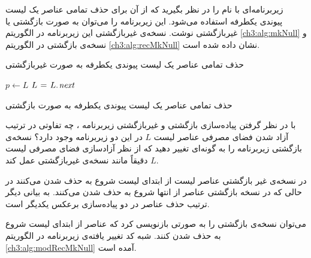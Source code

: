 

 زیربرنامه‌ای با نام {} را در نظر بگیرید که از آن برای حذف تمامی عناصر یک لیست پیوندی یکطرفه استفاده می‌شود. این زیربرنامه را می‌توان به صورت بازگشتی یا غیربازگشتی نوشت. نسخه‌ی غیربازگشتی این زیربرنامه در الگوریتم {\ref{ch3:alg:mkNull}} و نسخه‌ی بازگشتی در الگوریتم {\ref{ch3:alg:recMkNull}} نشان داده شده است.

\begin{algorithm}
\caption{حذف تمامی عناصر یک لیست پیوندی یکطرفه به صورت غیربازگشتی}\label{ch3:alg:mkNull}
\begin{latin}
\begin{algorithmic}[1]
				\State	$p \gets L$
				\State	$L \mathrel{\hspace{1pt}=\hspace{1pt}} L.\hspace*{1pt}\mathit{next}$
				\State	{}
		\EndWhile
\EndProcedure
\end{algorithmic}
\end{latin}
\end{algorithm}

\begin{algorithm}
\caption{حذف تمامی عناصر یک لیست پیوندی یکطرفه به صورت بازگشتی}\label{ch3:alg:recMkNull}
\begin{latin}
\begin{algorithmic}[1]
				\State \Return
		\Else
				\State	{}
				\State	{}
		\EndIf
\EndProcedure
\end{algorithmic}
\end{latin}
\end{algorithm}


با در نظر گرفتن پیاده‌سازی بازگشتی و غیربازگشتی زیربرنامه {}، چه تفاوتی در ترتیب آزاد شدن فضای مصرفی عناصر لیست {$L$} در این دو زیربرنامه وجود دارد؟ نسخه‌ی بازگشتی زیربرنامه را به گونه‌ای تغییر دهید که از نظر آزادسازی فضای مصرفی لیست {$L$} دقیقاً مانند نسخه‌ی غیربازگشتی عمل کند.


در نسخه‌ی غیر بازگشتی عناصر لیست از ابتدای لیست شروع به حذف شدن می‌کنند در حالی که در نسخه بازگشتی عناصر از انتها شروع به حذف شدن می‌کنند. به بیانی دیگر ترتیب حذف عناصر در دو پیاده‌سازی برعکس یکدیگر است.

می‌توان نسخه‌ی بازگشتی را به صورتی بازنویسی کرد که عناصر از ابتدای لیست شروع به حذف شدن کنند. شبه ‌کد تغییر یافته‌ی زیربرنامه {} در الگوریتم {\ref{ch3:alg:modRecMkNull}} آمده است.

